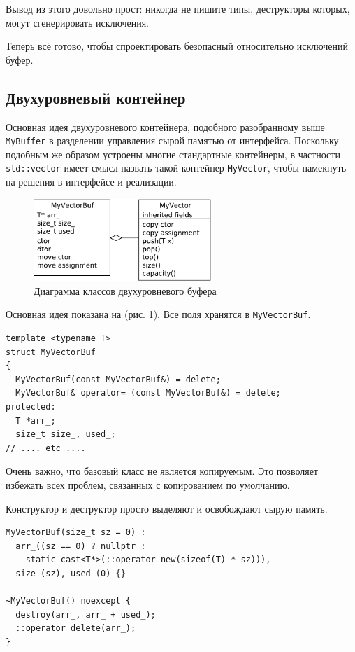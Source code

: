 \documentclass[a4paper,12pt,oneside]{book}
\begin{document}
Вывод из этого довольно прост: никогда не пишите типы, деструкторы которых, могут сгенерировать исключения. 

Теперь всё готово, чтобы спроектировать безопасный относительно исключений буфер.

\subsection{Двухуровневый контейнер}\label{subsub:twolevel}

Основная идея двухуровневого контейнера, подобного разобранному выше \lstinline!MyBuffer! в разделении управления сырой памятью от интерфейса. Поскольку подобным же образом устроены многие стандартные контейнеры, в частности \lstinline!std::vector! имеет смысл назвать такой контейнер \lstinline!MyVector!, чтобы намекнуть на решения в интерфейсе и реализации.

\begin{figure}[ht]
\centering
\includegraphics[width=0.6\textwidth]{illustrations/myvector-crop.pdf}
\caption{Диаграмма классов двухуровневого буфера}
\label{fig:my_vector}
\end{figure}

Основная идея показана на (рис. \ref{fig:my_vector}). Все поля хранятся в \lstinline!MyVectorBuf!.

\begin{lstlisting}
template <typename T>
struct MyVectorBuf 
{
  MyVectorBuf(const MyVectorBuf&) = delete;
  MyVectorBuf& operator= (const MyVectorBuf&) = delete;
protected:
  T *arr_;
  size_t size_, used_;
// .... etc ....
\end{lstlisting}

Очень важно, что базовый класс не является копируемым. Это позволяет избежать всех проблем, связанных с копированием по умолчанию.

Конструктор и деструктор просто выделяют и освобождают сырую память.

\begin{lstlisting}
MyVectorBuf(size_t sz = 0) : 
  arr_((sz == 0) ? nullptr : 
    static_cast<T*>(::operator new(sizeof(T) * sz))), 
  size_(sz), used_(0) {}

~MyVectorBuf() noexcept {
  destroy(arr_, arr_ + used_);
  ::operator delete(arr_);
}
\end{lstlisting}
\end{document}
